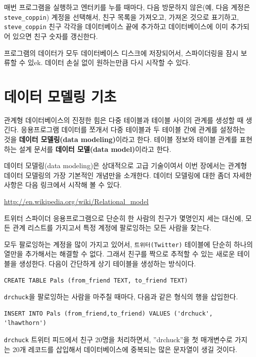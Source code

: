 매번 프로그램을 실행하고 엔터키를 누를 때마다, 
다음 방문하지 않은(예, 다음 계정은 \verb"steve_coppin") 계정을 선택해서, 
친구 목록을 가져오고, 가져온 것으로 표기하고, \verb"steve_coppin" 친구 각각을 데이터베이스 끝에
추가하고 데이터베이스에 이미 추가되어 있으면 친구 숫자를 갱신한다.

프로그램의 데이터가 모두 데이터베이스 디스크에 저장되어서, 스파이더링을 잠시 보류할 수 있ek.
데이터 손실 없이 원하는만큼 다시 시작할 수 있다.

\section{데이터 모델링 기초}

관계형 데이터베이스의 진정한 힘은 다중 테이블과 테이블 사이의 관계를 생성할 때 생긴다.
응용프로그램 데이터를 쪼개서 다중 테이블과 두 테이블 간에 관계를 설정하는 것을 {\bf 데이터 모델링(data modeling)}이라고 한다. 
테이블 정보와 테이블 관계를 표현하는 설계 문서를 {\bf 데이터 모델(data model)}이라고 한다.

데이터 모델링(data modeling)은 상대적으로 고급 기술이여서 이번 장에서는 관계형 데이터 모델링의 가장 기본적인 개념만을 소개한다.
데이터 모델링에 대한 좀더 자세한 사항은 다음 링크에서 시작해 볼 수 있다.

\url{http://en.wikipedia.org/wiki/Relational_model}

트위터 스파이더 응용프로그램으로 단순히 한 사람의 친구가  몇명인지 세는 대신에, 
모든 관계 리스트를 가지고서 특정 계정에 팔로잉하는 모든 사람을 찾는다.

모두 팔로잉하는 계정을 많이 가지고 있어서, {\tt 트위터(Twitter)} 테이블에 단순히 하나의 열만을 추가해서는 해결할 수 없다.
그래서 친구를 짝으로 추적할 수 있는 새로운 테이블을 생성한다. 
다음이 간단하게 상기 테이블을 생성하는 방식이다.

\beforeverb
\begin{verbatim}
CREATE TABLE Pals (from_friend TEXT, to_friend TEXT)
\end{verbatim}
\afterverb
%

{\tt drchuck}을 팔로잉하는 사람을 마주칠 때마다, 다음과 같은 형식의 행을 삽입한다.

\beforeverb
\begin{verbatim}
INSERT INTO Pals (from_friend,to_friend) VALUES ('drchuck', 'lhawthorn')
\end{verbatim}
\afterverb
%

{\tt drchuck} 트위터 피드에서 친구 20명을 처리하면서, 
''drchuck''을 첫 매개변수로 가지는 20개 레코드를 삽입해서 데이터베이스에 중복되는 많은 문자열이 생길 것이다.

